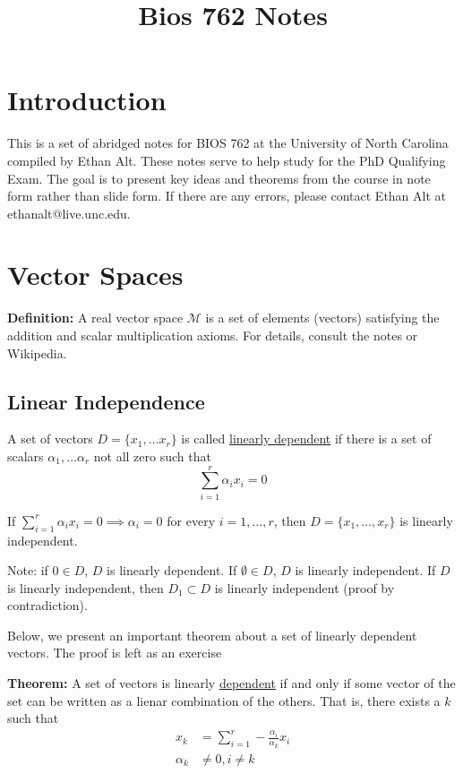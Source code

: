 \documentclass[12pt]{article}
\numberwithin{equation}{section}
\begin{document}
 

\title{Bios 762 Notes}
\date{}
\maketitle

\section{Introduction}
This is a set of abridged notes for BIOS 762 at the University of North Carolina compiled by Ethan Alt. These notes serve to help study for the PhD Qualifying Exam. The goal is to present key ideas and theorems from the course in note form rather than slide form. If there are any errors, please contact Ethan Alt at ethanalt@live.unc.edu.

\section{Vector Spaces}
\textbf{Definition:} A real vector space $\mathcal{M}$ is a set of elements (vectors) satisfying the addition and scalar multiplication axioms. For details, consult the notes or Wikipedia.

\subsection{Linear Independence}
A set of vectors $D = \{x_1, \ldots x_r \}$ is called \underline{linearly dependent} if there is a set of scalars $\alpha_1, \ldots \alpha_r$ not all zero such that
\begin{equation*}
  \sum_{i = 1}^r \alpha_i x_i = 0
\end{equation*}

If $\sum_{i = 1}^r \alpha_i x_i = 0 \implies \alpha_i = 0$ for every $i = 1, \ldots, r$, then $D = \{x_1, \ldots, x_r\}$ is linearly independent.

Note: if $0 \in D$, $D$ is linearly dependent. If $\emptyset \in D$, $D$ is linearly independent. If $D$ is linearly independent, then $D_1 \subset D$ is linearly independent (proof by contradiction).

Below, we present an important theorem about a set of linearly dependent vectors. The proof is left as an exercise

\textbf{Theorem:} A set of vectors is linearly \underline{dependent} if and only if some vector of the set can be written as a lienar combination of the others. That is, there exists a $k$ such that
\begin{align*}
  x_k &= \sum_{i = 1}^r - \frac{\alpha_i}{\alpha_k} x_i \\
  \alpha_k &\ne 0, i \ne k
\end{align*}
\end{document}
